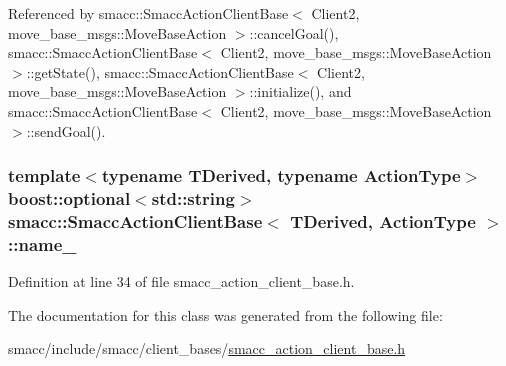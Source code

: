 Referenced by smacc\+::\+Smacc\+Action\+Client\+Base$<$ Client2, move\+\_\+base\+\_\+msgs\+::\+Move\+Base\+Action $>$\+::cancel\+Goal(), smacc\+::\+Smacc\+Action\+Client\+Base$<$ Client2, move\+\_\+base\+\_\+msgs\+::\+Move\+Base\+Action $>$\+::get\+State(), smacc\+::\+Smacc\+Action\+Client\+Base$<$ Client2, move\+\_\+base\+\_\+msgs\+::\+Move\+Base\+Action $>$\+::initialize(), and smacc\+::\+Smacc\+Action\+Client\+Base$<$ Client2, move\+\_\+base\+\_\+msgs\+::\+Move\+Base\+Action $>$\+::send\+Goal().

\subsubsection[{\texorpdfstring{name\+\_\+}{name_}}]{\setlength{\rightskip}{0pt plus 5cm}template$<$typename T\+Derived, typename Action\+Type$>$ boost\+::optional$<$std\+::string$>$ {\bf smacc\+::\+Smacc\+Action\+Client\+Base}$<$ T\+Derived, Action\+Type $>$\+::name\+\_\+}\hypertarget{classsmacc_1_1SmaccActionClientBase_a7fa0e4b63069bea12d47a83bd0be73d7}{}\label{classsmacc_1_1SmaccActionClientBase_a7fa0e4b63069bea12d47a83bd0be73d7}


Definition at line 34 of file smacc\+\_\+action\+\_\+client\+\_\+base.\+h.



The documentation for this class was generated from the following file\+:\begin{DoxyCompactItemize}
\item 
smacc/include/smacc/client\+\_\+bases/\hyperlink{smacc__action__client__base_8h}{smacc\+\_\+action\+\_\+client\+\_\+base.\+h}\end{DoxyCompactItemize}
